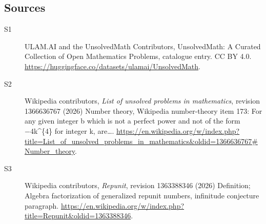 \documentclass[11pt]{article}
\begin{document}
\subsection{Sources}
\begin{description}
\item[\hypertarget{source:statement:1}{S1}] ULAM.AI and the UnsolvedMath Contributors, UnsolvedMath: A Curated Collection of Open Mathematics Problems, catalogue entry. CC BY 4.0. \url{https://huggingface.co/datasets/ulamai/UnsolvedMath}.
\item[\hypertarget{source:statement:2}{S2}] Wikipedia contributors, \emph{List of unsolved problems in mathematics}, revision 1366636767 (2026) Number theory, Wikipedia number-theory item 173: For any given integer b which is not a perfect power and not of the form −4k\textasciicircum{}\{4\} for integer k, are…. \url{https://en.wikipedia.org/w/index.php?title=List_of_unsolved_problems_in_mathematics&oldid=1366636767#Number_theory}.
\item[\hypertarget{source:statement:3}{S3}] Wikipedia contributors, \emph{Repunit}, revision 1363388346 (2026) Definition; Algebra factorization of generalized repunit numbers, infinitude conjecture paragraph. \url{https://en.wikipedia.org/w/index.php?title=Repunit&oldid=1363388346}.
\end{description}
\label{end:statement}
\end{document}
